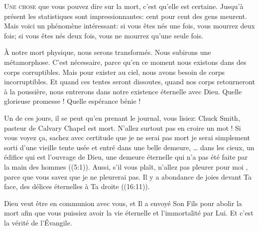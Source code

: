 \lettrine{U}{ne chose} que vous pouvez dire sur la mort,
 c'est qu'elle est certaine.
 Jusqu'à présent les statistiques sont impressionnantes:
 cent pour cent des gens meurent. Mais voici un phénomène intéressant:
 si vous êtes nés une fois, vous mourrez deux fois;
 si vous êtes nés deux fois, vous ne mourrez qu'une seule fois.

À notre mort physique, nous serons transformés.
 Nous subirons une métamorphose. C'est nécessaire, parce qu'en ce moment
 nous existons dans des corps corruptibles. Mais pour exister au ciel,
 nous avons besoin de corps incorruptibles. Et quand ces tentes
 seront dissoutes, quand nos corps retourneront à la poussière,
 nous entrerons dans notre existence éternelle avec Dieu.
 Quelle glorieuse promesse ! Quelle espérance bénie ! 


Un de ces jours, il se peut qu'en prenant le journal,
 vous lisiez: 
 \Og Chuck Smith, pasteur de Calvary Chapel est mort. \Fg{}
 N'allez surtout pas en croire un mot ! Si vous voyez \c{c}a,
 sachez avec certitude que je ne serai pas mort \ocadr je serai simplement
 sorti d'une vieille tente usée et entré dans une belle demeure,
 \Og \dots{} 
 dans les cieux, un édifice qui est l'ouvrage de Dieu, une demeure éternelle
 qui n'a pas été faite par la main des hommes \Fg{} ((5:1)).
 Aussi, s'il vous plaît, n'allez pas pleurer pour moi
 , parce que vous savez que je ne pleurerai pas.
 \Og Il y a abondance de joies devant Ta face, des délices éternelles
 à Ta droite \Fg{} ((16:11)). 

Dieu veut être en communion avec vous, et Il a envoyé Son Fils pour abolir
 la mort afin que vous puissiez avoir la vie éternelle
 et l'immortalité par Lui. Et c'est la vérité de l'Évangile.

\dvrule






